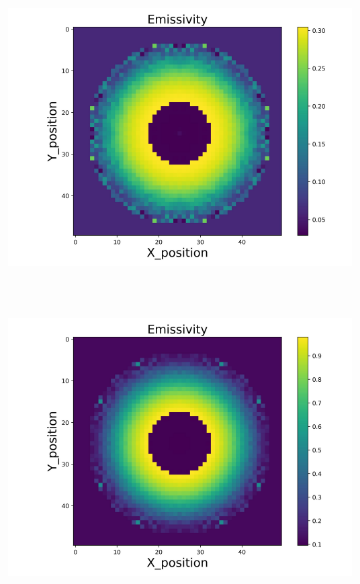 \begin{figure}[p]
\begin{minipage}{\textwidth}
        \begin{subfigure}{0.325\textwidth}
            \centering
            \includegraphics[width=\textwidth]{figures/raw_data/21/exp/emi_cal.jpg}
        \end{subfigure}
    \end{minipage}\\
    \begin{minipage}{\textwidth}
        \centering
        \begin{subfigure}{0.325\textwidth}
            \centering
            \includegraphics[width=\textwidth]{figures/raw_data/22/exp/emi_cal.jpg}
        \end{subfigure}

\end{minipage}
\end{figure}
